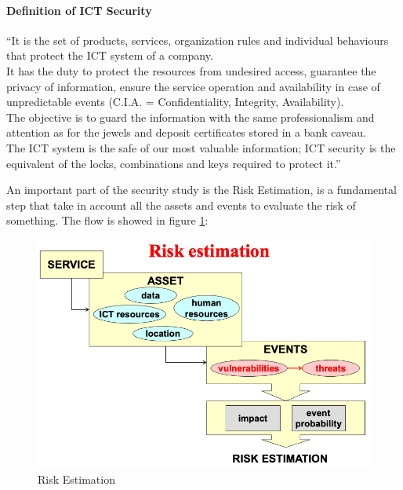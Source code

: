 \documentclass[12pt]{article}
\begin{document}
\paragraph{Definition of ICT Security}

\bigskip
``It is the set of products, services, organization rules and individual behaviours that protect the ICT system of a company.\\

It has the duty to protect the resources from undesired access, guarantee the privacy of information, ensure the service operation and availability in case of unpredictable events (C.I.A. = Confidentiality, Integrity, Availability).\\

The objective is to guard the information with the same professionalism and attention as for the jewels and deposit certificates stored in a bank caveau.\\

The ICT system is the safe of our most valuable information; ICT security is the equivalent of the locks, combinations and keys required to protect it.''\\
\bigskip

An important part of the security study is the Risk Estimation, is a fundamental step that take in account all the assets and events to evaluate the risk of something. The flow is showed in figure \ref{fig:risk_est}:

\begin{figure}[h!]
  \includegraphics[width=\linewidth]{images/risk_est.png}
  \caption{Risk Estimation}
  \label{fig:risk_est}
\end{figure}
\end{document}
